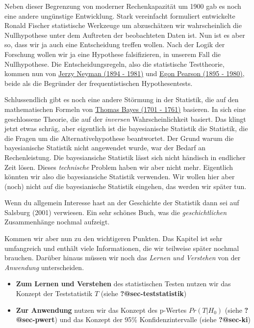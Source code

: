 \documentclass[
  letterpaper,
  DIV=11,
  oneside]{scrreport}
\providecommand{\tightlist}{%
  \setlength{\itemsep}{0pt}\setlength{\parskip}{0pt}}\usepackage{longtable,booktabs,array}
\begin{document}
{}

Neben dieser Begrenzung von moderner Rechenkapazität um 1900 gab es noch
eine andere ungünstige Entwicklung. Stark vereinfacht formuliert
entwickelte Ronald Fischer statistische Werkzeuge um abzuschätzen wir
wahrscheinlich die Nullhypothese unter dem Auftreten der beobachteten
Daten ist. Nun ist es aber so, dass wir ja auch eine Entscheidung
treffen wollen. Nach der Logik der Forschung wollen wir ja eine
Hypothese falsifizieren, in unserem Fall die Nullhypothese. Die
Entscheidungsregeln, also die statistische Testtheorie, kommen nun von
\href{https://en.wikipedia.org/wiki/Jerzy_Neyman}{Jerzy Neyman (1894 -
1981)} und \href{https://en.wikipedia.org/wiki/Egon_Pearson}{Egon
Pearson (1895 - 1980)}, beide als die Begründer der frequentistischen
Hypothesentests.

Schlussendlich gibt es noch eine andere Störmung in der Statistik, die
auf den mathematischen Formeln von
\href{https://en.wikipedia.org/wiki/Thomas_Bayes}{Thomas Bayes (1701 -
1761)} basieren. In sich eine geschlossene Theorie, die auf der
\emph{inversen} Wahrscheinlichkeit basiert. Das klingt jetzt etwas
schräg, aber eigentlich ist die bayesianische Statistik die Statistik,
die die Fragen um die Alternativehypothese beantwortet. Der Grund warum
die bayesianische Statistik nicht angewendet wurde, war der Bedarf an
Rechenleistung. Die bayesiansiche Statistik lässt sich nicht händisch in
endlicher Zeit lösen. Dieses \emph{technische} Problem haben wir aber
nicht mehr. Eigentlich könnten wir also die bayesiansiche Statistik
verwenden. Wir wollen hier aber (noch) nicht auf die bayesianische
Statistik eingehen, das werden wir später tun.

Wenn du allgemein Interesse hast an der Geschichte der Statistik dann
sei auf Salsburg (2001) verwiesen. Ein sehr schönes Buch, was die
\emph{geschichtlichen} Zusammenhänge nochmal aufzeigt.

Kommen wir aber nun zu den wichtigeren Punkten. Das Kapitel ist sehr
umfangreich und enthält viele Informationen, die wir teilweise später
nochmal brauchen. Darüber hinaus müssen wir noch das \emph{Lernen und
Verstehen} von der \emph{Anwendung} unterscheiden.

\begin{itemize}
\tightlist
\item
  \textbf{Zum Lernen und Verstehen} des statistischen Testen nutzen wir
  das Konzept der Teststatistik \(T\) (siehe
  \textbf{?@sec-teststatistik})
\item
  \textbf{Zur Anwendung} nutzen wir das Konzept des p-Wertes
  \(Pr(T|H_0)\) (siehe \textbf{?@sec-pwert}) und das Konzept der 95\%
  Konfidenzintervalle (siehe \textbf{?@sec-ki})
\end{itemize}
\end{document}
